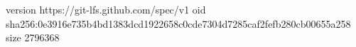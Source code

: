version https://git-lfs.github.com/spec/v1
oid sha256:0e3916e735b4bd1383dcd1922658c0cde7304d7285caf2fefb280cb00655a258
size 2796368
